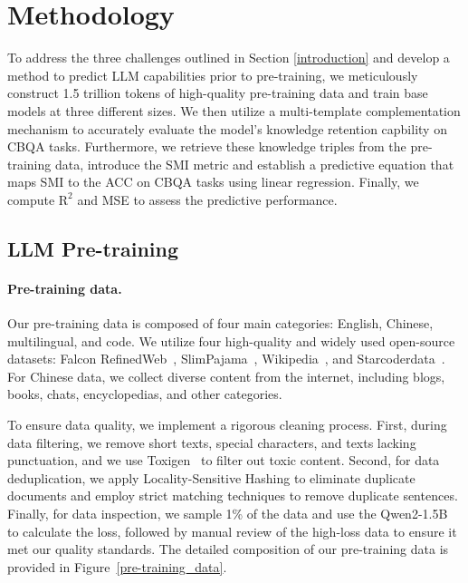 






\section{Methodology}
\label{methodology}
To address the three challenges outlined in Section \ref{introduction} and develop a method to predict LLM capabilities prior to pre-training, we meticulously construct 1.5 trillion tokens of high-quality pre-training data and train base models at three different sizes. We then utilize a multi-template complementation mechanism to accurately evaluate the model’s knowledge retention capbility on CBQA tasks. Furthermore, we retrieve these knowledge triples from the pre-training data, introduce the SMI metric and establish a predictive equation that maps SMI to the ACC on CBQA tasks using linear regression. Finally, we compute $\text{R}^2$ and MSE to assess the predictive performance.


\subsection{LLM Pre-training}
\label{3-1}

\paragraph{Pre-training data.} 
Our pre-training data is composed of four main categories: English, Chinese, multilingual, and code. We utilize four high-quality and widely used open-source datasets: Falcon RefinedWeb~\cite{refinedweb}, SlimPajama~\cite{cerebras2023slimpajama}, Wikipedia~\cite{wikidump}, and Starcoderdata~\cite{DBLP:journals/tmlr/LiAZMKMMALCLZZW23}. For Chinese data, we collect diverse content from the internet, including blogs, books, chats, encyclopedias, and other categories.

To ensure data quality, we implement a rigorous cleaning process. First, during data filtering, we remove short texts, special characters, and texts lacking punctuation, and we use Toxigen~\cite{hartvigsen2022toxigen} to filter out toxic content. Second, for data deduplication, we apply Locality-Sensitive Hashing to eliminate duplicate documents and employ strict matching techniques to remove duplicate sentences. Finally, for data inspection, we sample 1\% of the data and use the Qwen2-1.5B~\cite{DBLP:journals/corr/abs-2407-10671} to calculate the loss, followed by manual review of the high-loss data to ensure it met our quality standards. The detailed composition of our pre-training data is provided in Figure~\ref{pre-training_data}.

